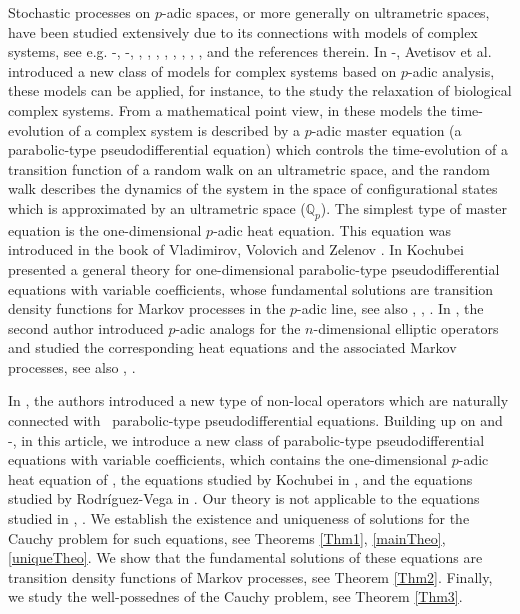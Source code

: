 \documentclass{amsart}\usepackage{amsfonts}
\theoremstyle{plain}
\numberwithin{equation}{section}
\begin{document}
Stochastic processes on $p$-adic spaces, or more generally on ultrametric
spaces, have been studied extensively due to its connections with models of
complex systems, see e.g. \cite{A-K1}-\cite{A-K2}, \cite{Av-3}-\cite{Av-5},
\cite{Ch-Z}, \cite{Dra-Kh-K-V}, \cite{Ka}, \cite{Koch}, \cite{K-Kos},
\cite{M-P-V}, \cite{R-T-V}, \cite{V-V-Z}, and the references therein. In
\cite{Av-3}-\cite{Av-5}, Avetisov et al. introduced a new class of models for
complex systems based on $p$-adic analysis, these models can be applied, for
instance, to the study the relaxation of biological complex systems. From a
mathematical point view, in these models the time-evolution of a complex
system is described by a $p$-adic master equation (a parabolic-type
pseudodifferential equation) which controls the time-evolution of a transition
function of a random walk on an ultrametric space, and the random walk
describes the dynamics of the system in the space of configurational states
which is approximated by an ultrametric space ($\mathbb{Q}_{p}$). The simplest
type of master equation is the one-dimensional $p$-adic heat equation. This
equation was introduced in the book of Vladimirov, Volovich and Zelenov
\cite[Section \ XVI]{V-V-Z}. In \cite[Chapters 4, 5]{Koch} Kochubei presented
a general theory for one-dimensional parabolic-type pseudodifferential
equations with variable coefficients, whose fundamental solutions are
transition density functions for Markov processes in the $p$-adic line, see
also \cite{Ro}, \cite{R-Zu}, \cite{Va1}. In \cite{Zu}, the second author
introduced $p$-adic analogs for the $n$-dimensional elliptic operators and
studied the corresponding heat equations and the associated Markov processes,
see also  \cite{C-Z2}, \cite{Va1}. 

In \cite{Ch-Z}, the authors introduced a new type of non-local operators which
are na\-turally connected with \ parabolic-type pseudodifferential equations.
Building up on \cite{Ch-Z} and \cite{Koch}-\cite{Koch0}, in this arti\-cle, we
introduce a new class of parabolic-type pseudodifferential equations with
variable coefficients, which contains the one-dimensional $p$-adic heat
equation of \cite{V-V-Z}, the equations studied by Kochubei in \cite{Koch},
and the equations studied by Rodríguez-Vega in \cite{Ro}. Our theory is not
applicable to the equations studied in \cite{Zu}, \cite{C-Z2}. We establish
the existence and uniqueness of solutions for the Cauchy problem for such
equations, see Theorems \ref{Thm1}, \ref{mainTheo}, \ref{uniqueTheo}. We show
that the fundamental solutions of these equations are transition density
functions of Markov processes, see Theorem \ref{Thm2}. Finally, we study the
well-possednes of the Cauchy problem, see Theorem \ref{Thm3}.
\end{document}
